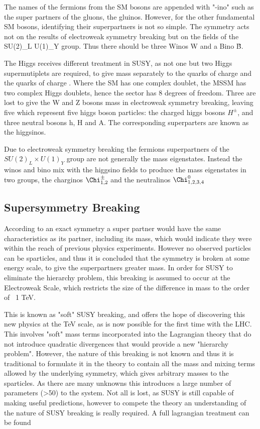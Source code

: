The names of the fermions from the SM bosons are appended with "-ino" such as the super partners of the gluons, the gluinos. However, for the other fundamental SM bosons, identifying their superpartners is not so simple. The symmetry acts not on the results of electroweak symmetry breaking but on the fields of the SU(2)_{L} \times U(1)_{Y} group. Thus there should be three Winos {W} and a Bino \~{B}. 

The Higgs receives different treatment in SUSY, as not one but two Higgs supermutiplets are required, to give mass separately to the quarks of charge  and the quarks of charge . Where the SM has one complex doublet, the MSSM has two complex Higgs doublets, hence the sector has 8 degrees of freedom. Three are lost to give the W and Z bosons mass in electroweak symmetry breaking, leaving five which represent five higgs boson particles: the charged higgs bosons $H^{\pm}$, and three neutral bosons h, H and A. The corresponding superparters are known as the higgsinos.  

Due to electroweak symmetry breaking the fermions superpartners of the $SU(2)_{L} \times U(1)_{Y}$ group are not generally the mass eigenstates. Instead the winos and bino mix with the higgsino fields to produce the mass eigenstates in two groups, the charginos $\Chi^{\pm}_{1,2}$ and the neutralinos $\Chi^{0}_{1,2,3,4}$

\subsection{Supersymmetry Breaking}

According to an exact symmetry a super partner would have the same characteristics as its partner, including its mass, which would indicate they were within the reach of previous physics experiments. However no observed particles can be sparticles, and thus it is concluded that the symmetry is broken at some energy scale, to give the superpartners greater mass. In order for SUSY to eliminate the hierarchy problem, this breaking is assumed to occur at the Electroweak Scale, which restricts the size of the difference in mass to the order of ~1 TeV.  

This is known as "soft" SUSY breaking, and offers the hope of discovering this new physics at the TeV scale, as is now possible for the first time with the LHC. This involves "soft" mass terms incorporated into the Lagrangian theory that do not introduce quadratic divergences that would provide a new "hierarchy problem". However, the nature of this breaking is not known and thus it is traditional to formulate it in the theory to contain all the mass and mixing terms allowed by the underlying symmetry, which gives arbitrary masses to the sparticles. As there are many unknowns this introduces a large number of parameters (>50) to the system. Not all is lost, as SUSY is still capable of making useful predictions, however to compete the theory an understanding of the nature of SUSY breaking is really required. A full lagrangian treatment can be found 


